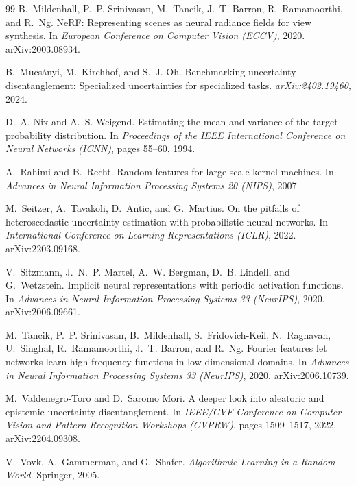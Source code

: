 \documentclass[10pt]{article}
\begin{document}
\begin{thebibliography}{99}
B.~Mildenhall, P.~P. Srinivasan, M.~Tancik, J.~T. Barron, R.~Ramamoorthi, and R.~Ng.
\newblock NeRF: Representing scenes as neural radiance fields for view synthesis.
\newblock In \emph{European Conference on Computer Vision (ECCV)}, 2020. arXiv:2003.08934.

B.~Mucs\'anyi, M.~Kirchhof, and S.~J. Oh.
\newblock Benchmarking uncertainty disentanglement: Specialized uncertainties for specialized
tasks.
\newblock \emph{arXiv:2402.19460}, 2024.

D.~A. Nix and A.~S. Weigend.
\newblock Estimating the mean and variance of the target probability distribution.
\newblock In \emph{Proceedings of the IEEE International Conference on Neural Networks
(ICNN)}, pages 55--60, 1994.

A.~Rahimi and B.~Recht.
\newblock Random features for large-scale kernel machines.
\newblock In \emph{Advances in Neural Information Processing Systems 20 (NIPS)}, 2007.

M.~Seitzer, A.~Tavakoli, D.~Antic, and G.~Martius.
\newblock On the pitfalls of heteroscedastic uncertainty estimation with probabilistic neural
networks.
\newblock In \emph{International Conference on Learning Representations (ICLR)}, 2022.
arXiv:2203.09168.

V.~Sitzmann, J.~N.~P. Martel, A.~W. Bergman, D.~B. Lindell, and G.~Wetzstein.
\newblock Implicit neural representations with periodic activation functions.
\newblock In \emph{Advances in Neural Information Processing Systems 33 (NeurIPS)}, 2020.
arXiv:2006.09661.

M.~Tancik, P.~P. Srinivasan, B.~Mildenhall, S.~Fridovich-Keil, N.~Raghavan, U.~Singhal,
R.~Ramamoorthi, J.~T. Barron, and R.~Ng.
\newblock Fourier features let networks learn high frequency functions in low dimensional
domains.
\newblock In \emph{Advances in Neural Information Processing Systems 33 (NeurIPS)}, 2020.
arXiv:2006.10739.

M.~Valdenegro-Toro and D.~Saromo Mori.
\newblock A deeper look into aleatoric and epistemic uncertainty disentanglement.
\newblock In \emph{IEEE/CVF Conference on Computer Vision and Pattern Recognition Workshops
(CVPRW)}, pages 1509--1517, 2022. arXiv:2204.09308.

V.~Vovk, A.~Gammerman, and G.~Shafer.
\newblock \emph{Algorithmic Learning in a Random World}.
\newblock Springer, 2005.

\end{thebibliography}
\end{document}
